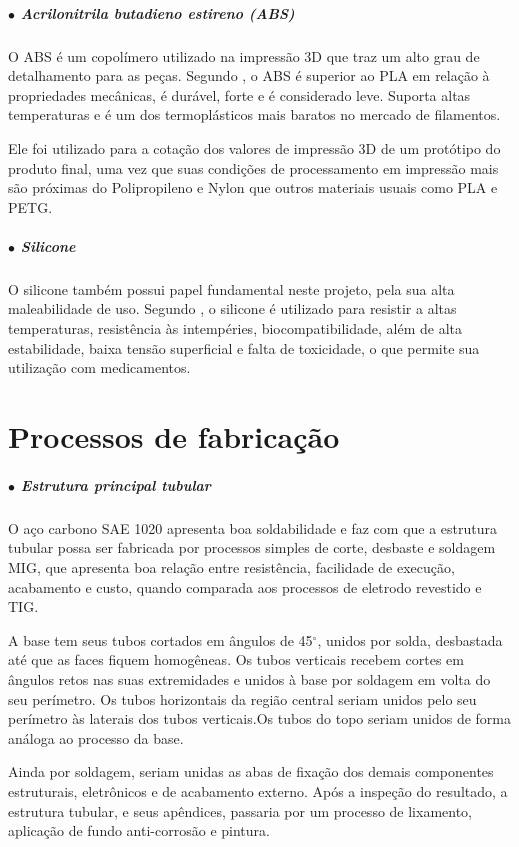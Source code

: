 \subparagraph*{$\bullet$ Acrilonitrila butadieno estireno (ABS)} \hfill

O ABS é um copolímero utilizado na impressão 3D que traz um alto grau de detalhamento para as peças. Segundo \cite{Imp3D_Polimeros}, o ABS é superior ao PLA em relação à propriedades mecânicas, é durável, forte e é considerado leve. Suporta altas temperaturas e é um dos termoplásticos mais baratos no mercado de filamentos.

Ele foi utilizado para a cotação dos valores de impressão 3D de um protótipo do produto final, uma vez que suas condições de processamento em impressão mais são próximas do Polipropileno e Nylon que outros materiais usuais como PLA e PETG.

\subparagraph*{$\bullet$ Silicone} \hfill

O silicone também possui papel fundamental neste projeto, pela sua alta maleabilidade de uso. Segundo \cite{Silicone_estudo}, o silicone é utilizado para resistir a altas temperaturas, resistência às intempéries, biocompatibilidade, além de alta estabilidade, baixa tensão superficial e falta de toxicidade, o que permite sua utilização com medicamentos.

\section{Processos de fabricação} 
\label{section:fabricacao}

\subparagraph*{$\bullet$ Estrutura principal tubular} \hfill

O aço carbono SAE 1020 apresenta boa soldabilidade e faz com que a estrutura tubular possa ser fabricada por processos simples de corte, desbaste e soldagem MIG, que apresenta boa relação entre resistência, facilidade de execução, acabamento e custo, quando comparada aos processos de eletrodo revestido e TIG.

A base tem seus tubos cortados em ângulos de 45$^{\circ}$, unidos por solda, desbastada até que as faces fiquem homogêneas. Os tubos verticais recebem cortes em ângulos retos nas suas extremidades e unidos à base por soldagem em volta do seu perímetro. Os tubos horizontais da região central seriam unidos pelo seu perímetro às laterais dos tubos verticais.Os tubos do topo seriam unidos de forma análoga ao processo da base.

Ainda por soldagem, seriam unidas as abas de fixação dos demais componentes estruturais, eletrônicos e de acabamento externo. Após a inspeção do resultado, a estrutura tubular, e seus apêndices, passaria por um processo de lixamento, aplicação de fundo anti-corrosão e pintura.

